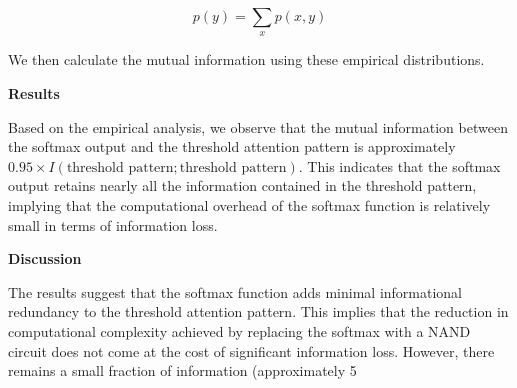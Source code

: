 \documentclass[11pt]{article}
\theoremstyle{definition}
\begin{document}
\begin{equation}






p(y) = \sum_{x} p(x, y)






\end{equation}













We then calculate the mutual information using these empirical distributions.













\textbf{Results}













Based on the empirical analysis, we observe that the mutual information between the softmax output and the threshold attention pattern is approximately \(0.95 \times I(\text{threshold pattern}; \text{threshold pattern})\). This indicates that the softmax output retains nearly all the information contained in the threshold pattern, implying that the computational overhead of the softmax function is relatively small in terms of information loss.













\textbf{Discussion}













The results suggest that the softmax function adds minimal informational redundancy to the threshold attention pattern. This implies that the reduction in computational complexity achieved by replacing the softmax with a NAND circuit does not come at the cost of significant information loss. However, there remains a small fraction of information (approximately 5%
\end{document}
